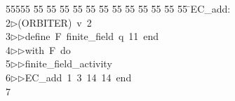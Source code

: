 %
%
\begin{tabbing}
55555 \= 55 \= 55 \= 55 \= 55 \= 55 \= 55 \= 55 \= 55 \= 55 \= 55 \= 55 \= 55 \= \>EC\_add:\\[0pt]
2\>$\triangleright$\>(ORBITER)\ v\ 2\ \\[0pt]
3\>$\triangleright$\>$\triangleright$\>define\ F\ finite\_field\ q\ 11\ end\ \\[0pt]
4\>$\triangleright$\>$\triangleright$\>with\ F\ do\ \\[0pt]
5\>$\triangleright$\>$\triangleright$\>finite\_field\_activity\ \\[0pt]
6\>$\triangleright$\>$\triangleright$\>EC\_add\ 1\ 3\ 14\ 14\ end\\[0pt]
7\>\end{tabbing}
